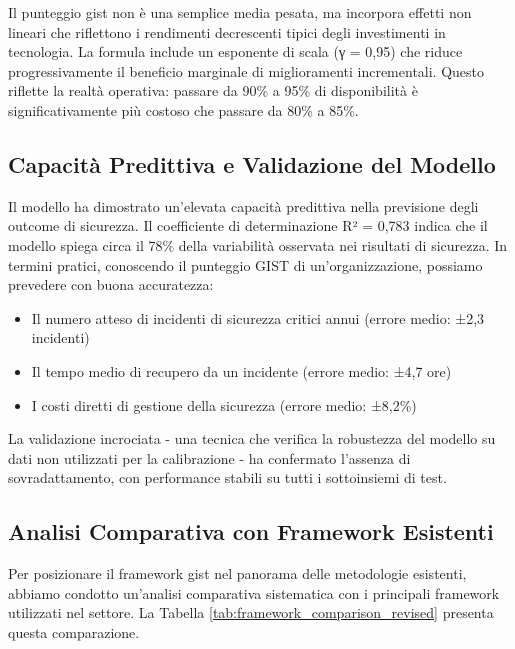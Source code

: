 \begin{tcolorbox}[
    colback=blue!5!white,
    colframe=blue!75!black,
    title={\textbf{Nota Metodologica:} Calcolo del Punteggio GIST},
    fonttitle=\bfseries
]
Il punteggio \gls{gist} non è una semplice media pesata, ma incorpora effetti non lineari che riflettono i rendimenti decrescenti tipici degli investimenti in tecnologia. La formula include un esponente di scala (γ = 0,95) che riduce progressivamente il beneficio marginale di miglioramenti incrementali. Questo riflette la realtà operativa: passare da 90\% a 95\% di disponibilità è significativamente più costoso che passare da 80\% a 85\%.
\end{tcolorbox}

\subsection{\texorpdfstring{Capacità Predittiva e Validazione del Modello}{5.3.2 - Capacità Predittiva e Validazione del Modello}}
\label{subsec:5.3.2}

Il modello ha dimostrato un'elevata capacità predittiva nella previsione degli outcome di sicurezza. Il coefficiente di determinazione R² = 0,783 indica che il modello spiega circa il 78\% della variabilità osservata nei risultati di sicurezza. In termini pratici, conoscendo il punteggio GIST di un'organizzazione, possiamo prevedere con buona accuratezza:
\begin{itemize}
\item Il numero atteso di incidenti di sicurezza critici annui (errore medio: ±2,3 incidenti)
\item Il tempo medio di recupero da un incidente (errore medio: ±4,7 ore)
\item I costi diretti di gestione della sicurezza (errore medio: ±8,2\%)
\end{itemize}

La validazione incrociata - una tecnica che verifica la robustezza del modello su dati non utilizzati per la calibrazione - ha confermato l'assenza di sovradattamento, con performance stabili su tutti i sottoinsiemi di test.

\subsection{\texorpdfstring{Analisi Comparativa con Framework Esistenti}{5.3.3 - Analisi Comparativa con Framework Esistenti}}
\label{subsec:5.3.3}

Per posizionare il framework \gls{gist} nel panorama delle metodologie esistenti, abbiamo condotto un'analisi comparativa sistematica con i principali framework utilizzati nel settore. La Tabella \ref{tab:framework_comparison_revised} presenta questa comparazione.

